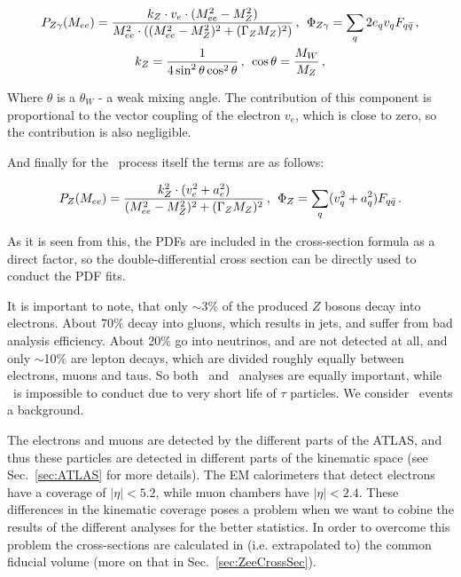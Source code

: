 \begin{equation}
\begin{gathered}
P_{Z\gamma}(M_{ee}) = \frac{k_{Z} \cdot v_{e} \cdot (M_{ee}^{2} - M_{Z}^{2})}{M_{ee}^{2} \cdot ((M_{ee}^{2} - M_{Z}^{2})^{2} + (\Gamma_{Z}M_{Z})^{2})}\,,\,\;
\Phi_{Z\gamma} = \sum_{q} 2e_{q}v_{q} F_{q\bar{q}} \,,\\
k_{Z} = \frac{1}{4\sin^{2}\theta\cos^{2}\theta} \,, \,\; \cos\theta = \frac{M_{W}}{M_{Z}} \,,
\end{gathered}
\end{equation}

Where $\theta$ is a $\theta_{W}$ - a weak mixing angle. The contribution of this component is proportional to the vector coupling of the electron $v_{e}$, which is close to zero, so the contribution is also negligible.

And finally for the \Zee\ process itself the terms are as follows:

\begin{equation}
P_{Z}(M_{ee}) = \frac{k^{2}_{Z} \cdot (v^{2}_{e} + a^{2}_{e})}{(M^{2}_{ee} - M^{2}_{Z})^{2} + (\Gamma_{Z}M_{Z})^{2}}\,,\,\;
\Phi_{Z} = \sum_{q} (v^{2}_{q} + a^{2}_{q}) F_{q\bar{q}} \,.
\end{equation}

As it is seen from this, the PDFs are included in the cross-section formula as a direct factor, so the double-differential cross section can be directly used to conduct the PDF fits.

It is important to note, that only $\sim$3\% of the produced $Z$ bosons decay into electrons. About 70\% decay into gluons, which results in jets, and suffer from bad analysis efficiency. About 20\% go into neutrinos, and are not detected at all, and only $\sim$10\% are lepton decays, which are divided roughly equally between electrons, muons and taus. So both \Zee\ and \Zmm\ analyses are equally important, while \Ztau\ is impossible to conduct due to very short life of $\tau$ particles. We consider \Ztau\ events a background.

The electrons and muons are detected by the different parts of the ATLAS, and thus these particles are detected in different parts of the kinematic space (see Sec.~\ref{sec:ATLAS} for more details). The EM calorimeters that detect electrons have a coverage of $|\eta| < 5.2$, while muon chambers have $|\eta| < 2.4$. These differences in the kinematic coverage poses a problem when we want to cobine the results of the different analyses for the better statistics. In order to overcome this problem the cross-sections are calculated in (i.e. extrapolated to) the common fiducial volume (more on that in Sec.~\ref{sec:ZeeCrossSec}).
